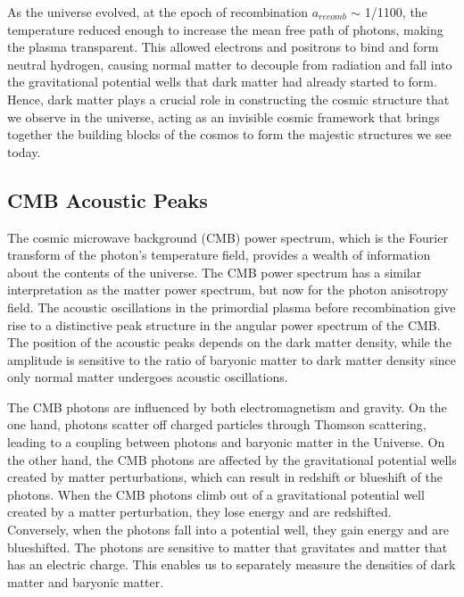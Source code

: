 \hspace{0.5cm}As the universe evolved, at the epoch of recombination $a_{recomb}$ $\sim$ 1/1100, the temperature reduced enough to increase the mean free path of photons, making the plasma transparent. This allowed electrons and positrons to bind and form neutral hydrogen, causing normal matter to decouple from radiation and fall into the gravitational potential wells that dark matter had already started to form. Hence, dark matter plays a crucial role in constructing the cosmic structure that we observe in the universe, acting as an invisible cosmic framework that brings together the building blocks of the cosmos to form the majestic structures we see today.



\subsection{CMB Acoustic Peaks}
\hspace{0.5cm}The cosmic microwave background (CMB) power spectrum, which is the Fourier transform of the photon's temperature field, provides a wealth of information about the contents of the universe. The CMB power spectrum has a similar interpretation as the matter power spectrum, but now for the photon anisotropy field. The acoustic oscillations in the primordial plasma before recombination give rise to a distinctive peak structure in the angular power spectrum of the CMB. The position of the acoustic peaks depends on the dark matter density, while the amplitude is sensitive to the ratio of baryonic matter to dark matter density since only normal matter undergoes acoustic oscillations.

The CMB photons are influenced by both electromagnetism and gravity. On the one hand, photons scatter off charged particles through Thomson scattering, leading to a coupling between photons and baryonic matter in the Universe. On the other hand, the CMB photons are affected by the gravitational potential wells created by matter perturbations, which can result in redshift or blueshift of the photons. When the CMB photons climb out of a gravitational potential well created by a matter perturbation, they lose energy and are redshifted. Conversely, when the photons fall into a potential well, they gain energy and are blueshifted. The photons are sensitive to matter that gravitates and matter that has an electric charge. This enables us to separately measure the densities of dark matter and baryonic matter.


